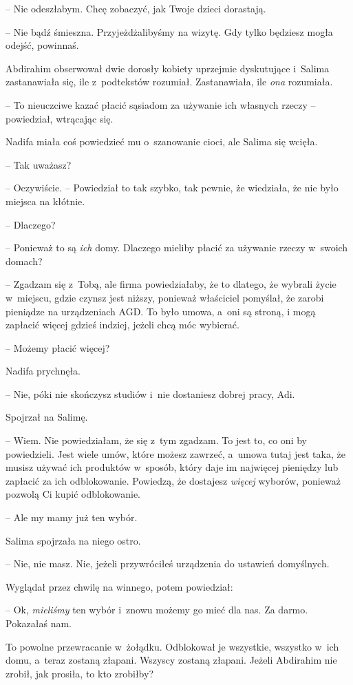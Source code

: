 \documentclass[oneside,polish,11pt,sfheadings]{mwbk}
\begin{document}
-- Nie odeszłabym. Chcę zobaczyć, jak Twoje dzieci dorastają.

-- Nie bądź śmieszna. Przyjeżdżalibyśmy na wizytę. Gdy tylko będziesz
mogła odejść, powinnaś.

Abdirahim obserwował dwie dorosły kobiety uprzejmie dyskutujące i~Salima
zastanawiała się, ile z~podtekstów rozumiał. Zastanawiała, ile
\textit{ona} rozumiała.

-- To nieuczciwe kazać płacić sąsiadom za używanie ich własnych rzeczy -- powiedział, wtrącając się.

Nadifa miała coś powiedzieć mu o~szanowanie cioci, ale Salima się
wcięła.

-- Tak uważasz?

-- Oczywiście. -- Powiedział to tak szybko, tak pewnie, że wiedziała, że
nie było miejsca na kłótnie.

-- Dlaczego?

-- Ponieważ to są \textit{ich }domy. Dlaczego mieliby płacić za używanie
rzeczy w~swoich domach?

-- Zgadzam się z~Tobą, ale firma powiedziałaby, że to dlatego, że wybrali
życie w~miejscu, gdzie czynsz jest niższy, ponieważ właściciel pomyślał,
że zarobi pieniądze na urządzeniach AGD. To było umowa, a~oni są stroną,
i mogą zapłacić więcej gdzieś indziej, jeżeli chcą móc wybierać.

-- Możemy płacić więcej?

Nadifa prychnęła. 

-- Nie, póki nie skończysz studiów i~nie dostaniesz
dobrej pracy, Adi.

Spojrzał na Salimę.

-- Wiem. Nie powiedziałam, że się z~tym zgadzam. To jest to, co oni by
powiedzieli. Jest wiele umów, które możesz zawrzeć, a~umowa tutaj jest
taka, że musisz używać ich produktów w~sposób, który daje im najwięcej
pieniędzy lub zapłacić za ich odblokowanie. Powiedzą, że dostajesz
\textit{więcej} wyborów, ponieważ pozwolą Ci kupić odblokowanie.

-- Ale my mamy już ten wybór.

Salima spojrzała na niego ostro. 

-- Nie, nie masz. Nie, jeżeli
przywróciłeś urządzenia do ustawień domyślnych.

Wyglądał przez chwilę na winnego, potem powiedział: 

-- Ok,
\textit{mieliśmy} ten wybór i~znowu możemy go mieć dla nas. Za darmo.
Pokazałaś nam.

To powolne przewracanie w~żołądku. Odblokował je wszystkie, wszystko w~ich domu, a~teraz zostaną złapani. Wszyscy zostaną złapani. Jeżeli
Abdirahim nie zrobił, jak prosiła, to kto zrobiłby?
\end{document}
